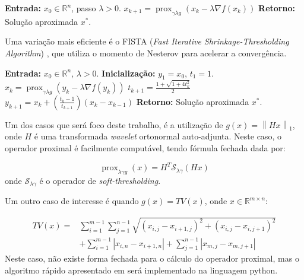 \documentclass[12pt]{article}
\DeclareMathOperator{\prox}{prox}
\newcommand{\norm}[1]{\left\lVert#1\right\rVert}
\begin{document}
\begin{algorithm}[H]
\caption{ISTA}
\begin{algorithmic}[1]
\State \textbf{Entrada:} $x_0 \in \mathbb{R}^n$, passo $\lambda > 0$.
    \State $x_{k+1} = \operatorname{prox}_{\gamma \lambda g} ( x_k - \lambda \nabla f( x_k ) )$
\EndFor
\State \textbf{Retorno:} Solução aproximada $x^*$.
\end{algorithmic}
\end{algorithm}

Uma variação mais eficiente é o FISTA (\textit{Fast Iterative Shrinkage-Thresholding Algorithm}) \cite{bet09}, que utiliza o momento de Nesterov para acelerar a convergência.

\begin{algorithm}[H]
\caption{FISTA}
\begin{algorithmic}[1]
\State \textbf{Entrada:} $x_0 \in \mathbb{R}^n$, $\lambda > 0$.
\State \textbf{Inicialização:} $y_1 = x_0$, $t_1 = 1$.
    \State $x_k = \operatorname{prox}_{\gamma \lambda g} ( y_k - \lambda \nabla f( y_k ) )$
    \State $t_{k+1} = \frac{1 + \sqrt{ 1 + 4 t_k^2 }}{2}$
    \State $y_{k+1} = x_k + \left( \frac{t_k - 1}{t_{k+1}} \right) ( x_k - x_{k-1} )$
\EndFor
\State \textbf{Retorno:} Solução aproximada $x^*$.
\end{algorithmic}
\end{algorithm}


Um dos casos que será foco deste trabalho, é a utilização de $g(x) = \norm{Hx}_1$, onde $H$ é uma transformada \textit{wavelet} ortonormal auto-adjunta. Neste caso, o operador proximal é facilmente computável, tendo fórmula fechada dada por:

\[
\prox_{\lambda \gamma g}(x) = H^T \mathcal{S}_{\lambda \gamma}(Hx)
\]
onde $\mathcal{S}_{\lambda \gamma}$ é o operador de \textit{soft-thresholding}.

Um outro caso de interesse é quando $g(x) = TV(x)$, onde $x \in \mathbb{R}^{m \times n}$:

\[
\begin{aligned}
TV(x) = 
& \sum_{i=1}^{m-1} \sum_{j=1}^{n-1} 
\sqrt{(x_{i,j} - x_{i+1,j})^2 + (x_{i,j} - x_{i,j+1})^2} \\
& + \sum_{i=1}^{m-1} |x_{i,n} - x_{i+1,n}| + \sum_{j=1}^{n-1} |x_{m,j} - x_{m,j+1}|
\end{aligned}
\]
Neste caso, não existe forma fechada para o cálculo do operador proximal, mas o algoritmo rápido apresentado em \cite{bet09b} será implementado na linguagem python. 
\end{document}
